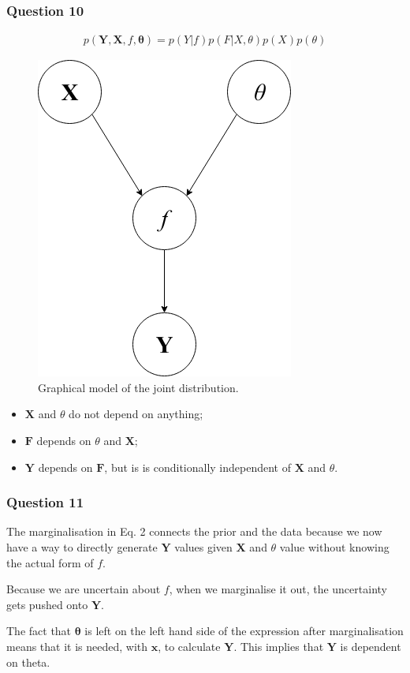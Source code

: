 \documentclass[10pt, a4paper, twocolumn]{article} %
\begin{document}
\subsubsection*{Question 10}

\begin{align}
  p(\mathbf{Y},\mathbf{X}, f, \mathbf{\theta}) = p(Y|f)p(F|X,\theta)p(X)p(\theta)
\end{align}

\begin{figure}[htbp]
\centerline{\includegraphics[width=0.5\linewidth]{question_10.png}}
\caption{Graphical model of the joint distribution.}
\label{fig2}
\end{figure}

\begin{itemize}
\item $\mathbf{X}$ and $\theta$ do not depend on anything;
\item $\mathbf{F}$ depends on $\theta$ and $\mathbf{X}$;
\item $\mathbf{Y}$ depends on $\mathbf{F}$, but is is conditionally independent of $\mathbf{X}$ and $\theta$.
\end{itemize}
\subsubsection*{Question 11}

The marginalisation in Eq. 2 connects the prior and the data because we now have a way to directly generate $\mathbf{Y}$  values given $\mathbf{X}$ and $\theta$ value without knowing the actual form of $f$.
\par
Because we are uncertain about $f$, when we marginalise it out, the uncertainty gets pushed onto $\mathbf{Y}$.
\par
The fact that $\mathbf{\theta}$ is left on the left hand side of the expression after marginalisation means that it is needed, with $\mathbf{x}$, to calculate $\mathbf{Y}$. This implies that $\mathbf{Y}$ is dependent on theta.
\end{document}
